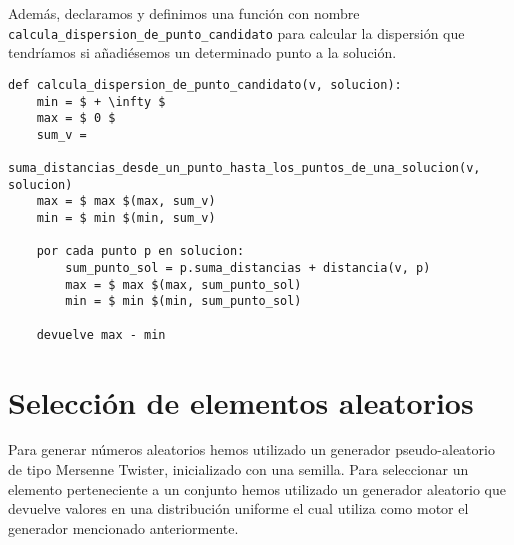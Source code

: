 Además, declaramos y definimos una función con nombre \texttt{calcula\_dispersion\_de\_punto\_candidato} para calcular
la dispersión que tendríamos si añadiésemos un determinado punto a la solución.

\begin{minipage}{\textwidth}
\begin{lstlisting}[mathescape=true,caption={Definición de la función que nos permite calcular la dispersión de un punto candidato si perteneciese a una solución.},captionpos=b]
def calcula_dispersion_de_punto_candidato(v, solucion):
    min = $ + \infty $
    max = $ 0 $
    sum_v =
        suma_distancias_desde_un_punto_hasta_los_puntos_de_una_solucion(v, solucion)
    max = $ max $(max, sum_v)
    min = $ min $(min, sum_v)

    por cada punto p en solucion:
        sum_punto_sol = p.suma_distancias + distancia(v, p)
        max = $ max $(max, sum_punto_sol)
        min = $ min $(min, sum_punto_sol)
    
    devuelve max - min
\end{lstlisting}
\end{minipage}

\section{Selección de elementos aleatorios}

Para generar números aleatorios hemos utilizado un generador pseudo-aleatorio de tipo Mersenne Twister, inicializado con una semilla.
Para seleccionar un elemento perteneciente a un conjunto hemos utilizado un generador aleatorio que devuelve valores en una distribución uniforme
el cual utiliza como motor el generador mencionado anteriormente.